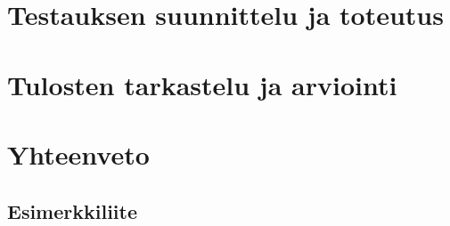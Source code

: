 \documentclass[finnish, authoryear]{config/tauthesis}
\theoremstyle{definition}
\begin{document}
\chapter{Testauksen suunnittelu ja toteutus} \label{11_testauksen_suunnittelu_ja_toteutus}
  
\chapter{Tulosten tarkastelu ja arviointi} \label{12_tulosten_tarkastelu_ja_arviointi}
  
\chapter{Yhteenveto} \label{13_yhteenveto}
  
\printbibliography[heading=bibintoc]

\begin{appendices}
\chapter{Esimerkkiliite} \label{14_liite}
  
\end{appendices}
\end{document}
